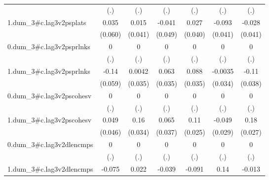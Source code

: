 \begin{table}[htbp]
\begin{tabular}{l*{6}{c}}
            &         (.)         &         (.)         &         (.)         &         (.)         &         (.)         &         (.)         \\
[1em]
1.dum\_3#c.lag3v2psplats&       0.035         &       0.015         &      -0.041         &       0.027         &      -0.093\sym{*}  &      -0.028         \\
            &     (0.060)         &     (0.041)         &     (0.049)         &     (0.040)         &     (0.041)         &     (0.041)         \\
[1em]
0.dum\_3#c.lag3v2psprlnks&           0         &           0         &           0         &           0         &           0         &           0         \\
            &         (.)         &         (.)         &         (.)         &         (.)         &         (.)         &         (.)         \\
[1em]
1.dum\_3#c.lag3v2psprlnks&       -0.14\sym{*}  &      0.0042         &       0.063         &       0.088\sym{*}  &     -0.0035         &       -0.11\sym{**} \\
            &     (0.059)         &     (0.035)         &     (0.035)         &     (0.035)         &     (0.034)         &     (0.038)         \\
[1em]
0.dum\_3#c.lag3v2pscohesv&           0         &           0         &           0         &           0         &           0         &           0         \\
            &         (.)         &         (.)         &         (.)         &         (.)         &         (.)         &         (.)         \\
[1em]
1.dum\_3#c.lag3v2pscohesv&       0.049         &        0.16\sym{***}&       0.065         &        0.11\sym{***}&      -0.049         &        0.18\sym{***}\\
            &     (0.046)         &     (0.034)         &     (0.037)         &     (0.025)         &     (0.029)         &     (0.027)         \\
[1em]
0.dum\_3#c.lag3v2dlencmps&           0         &           0         &           0         &           0         &           0         &           0         \\
            &         (.)         &         (.)         &         (.)         &         (.)         &         (.)         &         (.)         \\
[1em]
1.dum\_3#c.lag3v2dlencmps&      -0.075         &       0.022         &      -0.039         &      -0.091\sym{**} &        0.14\sym{***}&      -0.013         \\

\end{tabular}
\end{table}
